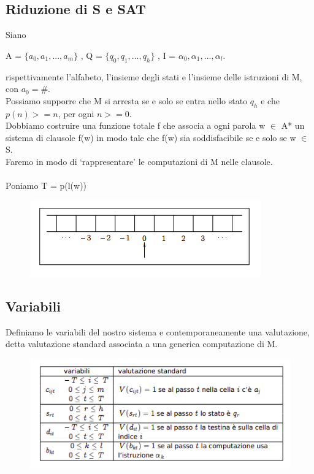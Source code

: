 \newpage
\subsection{Riduzione di S e SAT}
Siano
\begin{center}
    A = $\{a_0,a_1,..., a_m \}$ , Q = $\{q_0, q_1,...,q_h \}$ , I = ${\alpha_0, \alpha_1,..., \alpha_l}$.
\end{center}
rispettivamente l’alfabeto, l’insieme degli stati e l’insieme delle istruzioni di M, con $a_0 = \#$.\\
Possiamo supporre che M si arresta se e solo se entra nello stato $q_h$ e che $p(n) >= n$, per ogni $n >= 0$.\\
Dobbiamo costruire una funzione totale f che associa a ogni parola w $\in$ A* un sistema di clausole f(w) in modo tale che f(w) sia soddisfacibile se e solo se w $\in$ S.\\
Faremo in modo di ‘rappresentare’ le computazioni di M nelle clausole.\\\\
Poniamo T = p(l(w))
\begin{figure}[htp]
    \centering
    \includegraphics[scale=0.9]{tesi_stile/img/foto4cap12.png}
\end{figure}
\subsection{Variabili}
Definiamo le variabili del nostro sistema e contemporaneamente una
valutazione, detta valutazione standard associata a una generica
computazione di M.
\begin{figure}[htp]
    \centering
    \includegraphics[scale=0.9]{tesi_stile/img/foto5cap12.png}
\end{figure}
